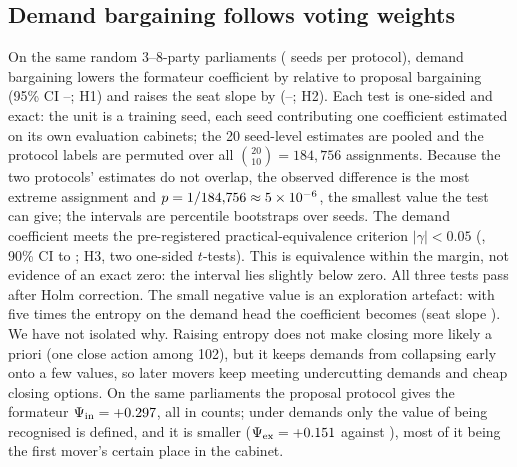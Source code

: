 \documentclass[11pt,a4paper]{article}
\begin{document}


\subsection{Demand bargaining follows voting weights}\label{sec:protocol}
On the same random 3--8-party parliaments (\NprotSeeds{} seeds per protocol), demand bargaining lowers the formateur coefficient by \HoneDiff{} relative to proposal bargaining (95\% CI
\HoneLo--\HoneHi; H1) and raises the seat slope by \HtwoDiff{} (\HtwoLo--\HtwoHi; H2). Each test is
one-sided and exact: the unit is a training seed, each seed contributing one coefficient estimated on its
own evaluation cabinets; the 20 seed-level estimates are pooled and the protocol labels are permuted over
all $\binom{20}{10}=184{,}756$ assignments. Because the two protocols' estimates do not overlap, the
observed difference is the most extreme assignment and $p=1/184{,}756\approx5\times10^{-6}$, the smallest value the
test can give; the intervals are percentile bootstraps over seeds. The demand coefficient meets the
pre-registered practical-equivalence criterion $|\gamma|<0.05$ (\HthreeMean, 90\% CI \HthreeLo{} to
\HthreeHi; H3, two one-sided $t$-tests). This is equivalence within the margin, not evidence of an exact
zero: the interval lies slightly below zero. All three tests pass after Holm correction. The small negative value is an exploration artefact: with five times the entropy on the demand head
the coefficient becomes \ExpDemG{} (seat slope \ExpDemB). We have not isolated why. Raising entropy does
not make closing more likely a priori (one close action among 102), but it keeps demands from collapsing
early onto a few values, so later movers keep meeting undercutting demands and cheap closing options.
On the same parliaments the proposal protocol gives the formateur $\Psi_{\mathrm{in}}=+0.297$, all
in counts; under demands only the value of being recognised is defined, and it is smaller
($\Psi_{\mathrm{ex}}=+0.151$ against \PsiWidePropEx), most of it being the first mover's certain
place in the cabinet.
\end{document}
